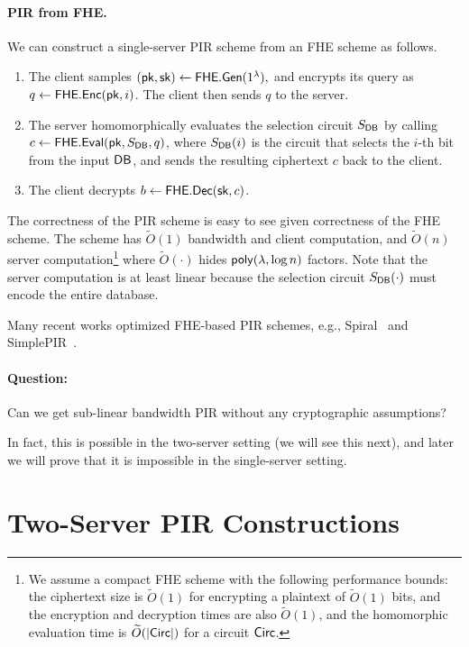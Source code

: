 \paragraph{PIR from FHE.}
We can construct a single-server PIR scheme from an FHE scheme 
as follows.
\begin{enumerate}
	\item The client samples $({\sf pk},{\sf sk}) \leftarrow {\sf FHE}.{\sf Gen}(1^\lambda),$ and encrypts its 
query as $q \leftarrow {\sf FHE}.{\sf Enc}({\sf pk}, i)$. The client then sends $q$ to the server.
	\item The server homomorphically evaluates the selection 
circuit $S_{{\sf DB}}$ 
by calling 
${c} \leftarrow  {\sf FHE}.{\sf Eval}({\sf pk}, S_{{\sf DB}}, q)$, 
where $S_{{\sf DB}}(i)$ 
is the circuit that selects the $i$-th bit from the input ${\sf DB}$, 
and sends the resulting ciphertext $c$ back to the client. 
	\item The client decrypts $b \leftarrow {\sf FHE}.{\sf Dec}({\sf sk}, c)$.
\end{enumerate}
The correctness of the PIR scheme is easy to see
given correctness of the FHE scheme. 
The scheme has $\widetilde{O}(1)$ bandwidth and 
client computation, and $\widetilde{O}(n)$ 
server computation\footnote{We assume a compact
FHE scheme with the following
performance bounds: 
the ciphertext size is 
$\widetilde{O}(1)$ for encrypting a plaintext
of $\widetilde{O}(1)$ bits, and the encryption
and decryption times are also $\widetilde{O}(1)$, 
and the homomorphic evaluation
time
is $\widetilde{O}(|{\sf Circ}|)$
 for a circuit ${\sf Circ}$.} 
where $\widetilde{O}(\cdot)$ hides
${\sf poly}(\lambda, \log n)$ factors.
Note that the server computation is at least linear
because the selection circuit $S_{{\sf DB}}(\cdot)$ 
must encode the entire database.

Many recent works optimized FHE-based PIR schemes,  
e.g., Spiral~\cite{spiral} 
and SimplePIR~\cite{simplepir}.

\paragraph{Question:} Can we get sub-linear bandwidth PIR 
without any cryptographic assumptions? 

In fact, this is possible in the two-server setting (we will see this next), 
and later we will prove that it is impossible in the single-server setting.

\section{Two-Server PIR Constructions}

